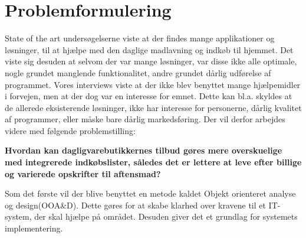 \chapter{Problemformulering}

State of the art undersøgelserne viste at der findes mange applikationer og løsninger, til at hjælpe med den daglige madlavning og indkøb til hjemmet. 
Det viste sig desuden at selvom der var mange løsninger, var disse ikke alle optimale, nogle grundet manglende funktionalitet, andre grundet dårlig udførelse af programmet. 
Vores interviews viste at der ikke blev benyttet mange hjælpemidler i forvejen, men at der dog var en interesse for emnet.
Dette kan bl.a. skyldes at de allerede eksisterende løsninger, ikke har interesse for personerne, dårlig kvalitet af programmer, eller måske bare dårlig markedsføring. Der vil derfor arbejdes videre med følgende problemstilling:

\textbf{Hvordan kan dagligvarebutikkernes tilbud gøres mere overskuelige med integrerede indkøbslister, således det er lettere at leve efter billige og varierede opskrifter til aftensmad?}

Som det første vil der blive benyttet en metode kaldet Objekt orienteret analyse og design(OOA\&D).
Dette gøres for at skabe klarhed over kravene til et IT-system, der skal hjælpe på området.
Desuden giver det et grundlag for systemets implementering. 